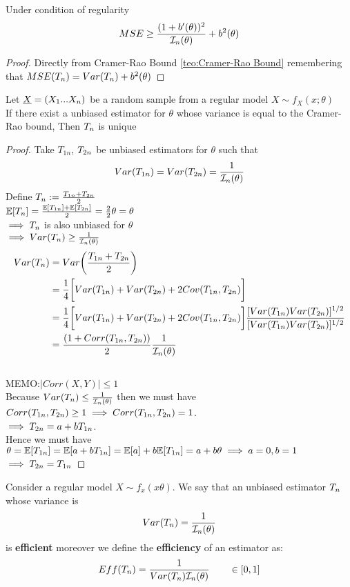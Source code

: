 \begin{corol}
	Under condition of regularity
	\[MSE \geq \frac{(1+b'(\theta))^2}{\mathcal{I}_n(\theta)} +b^2(\theta) \]
\end{corol}
\begin{proof}
	Directly from Cramer-Rao Bound \ref{teo:Cramer-Rao Bound} remembering that $MSE(T_{n})=Var(T_{n})+b^2(\theta)$
\end{proof}

\begin{corol}
	Let $\underline X=(X_1... X_n)$ be a random sample from a regular model $X\sim f_X(x;\theta)$\\
	If there exist a unbiased estimator for $\theta$ whose variance is equal to the Cramer-Rao bound, Then $T_{n}$ is unique
\end{corol}
\begin{proof}
	Take $T_{1n}$, $T_{2n}$ be unbiased estimators for $\theta$ such that
	\[
	Var(T_{1n})=Var(T_{2n})=\frac{1}{\mathcal{I}_n(\theta)}
	\]
	Define $T_{n} := \frac{T_{1n} + T_{2n}}{2}$\\
	$\mathbb{E}[T_{n}]=\frac{\mathbb{E}[T_{1n}]+\mathbb{E}[T_{2n}]}{2}=\frac{2}{2}\theta=\theta$\\
	$\implies T_{n}$ is also unbiased for $\theta$\\
	$\implies Var(T_{n})\geq \frac{1}{\mathcal{I}_n(\theta)}$
	\[
	\begin{split}
	Var(T_{n})
	&=Var\bigg( \frac{T_{1n} + T_{2n}}{2}  \bigg)\\
	&=\frac{1}{4}\bigg[ Var(T_{1n})+ Var(T_{2n}) +2 Cov(T_{1n}, T_{2n}) \bigg]\\
	&=\frac{1}{4 }\bigg[ Var(T_{1n})+ Var(T_{2n}) +2 Cov(T_{1n}, T_{2n}) \bigg]\frac{[Var(T_{1n})Var(T_{2n})]^{1/2}}{[Var(T_{1n})Var(T_{2n})]^{1/2}}\\
	&=\frac{(1+Corr(T_{1n},T_{2n}))}{2}\frac{1}{\mathcal{I}_n(\theta)}
	\end{split}
	\]
	\\MEMO:$|Corr(X,Y)|\leq 1$\\
	Because $Var(T_{n})\leq\frac{1}{\mathcal{I}_n(\theta)}$ then we must have  $Corr(T_{1n},T_{2n})\geq 1 \implies Corr(T_{1n},T_{2n})= 1$.\\
	$\implies T_{2n}=a+bT_{1n}$.\\
	Hence we must have $\theta=\mathbb{E}[T_{1n}]=\mathbb{E}[a+bT_{1n}]=\mathbb{E}[a]+b\mathbb{E}[T_{1n}]=a+b\theta\implies a=0,b=1$\\
	$\implies T_{2n}=T_{1n}$
\end{proof}
\begin{defi}
	Consider a regular model $X\sim f_x(x\theta)$. We say that an unbiased estimator $T_{n}$ whose variance is 
	\[
	Var(T_{n})=\frac{1}{\mathcal{I}_n(\theta)}
	\]
	is \textbf{efficient} moreover we define the \textbf{efficiency} of an estimator as:
	\[
	Eff(T_{n})=\frac{1}{Var(T_{n})\mathcal{I}_n(\theta)} \ \ \ \ \ \ \in [0,1]
	\]
\end{defi}
